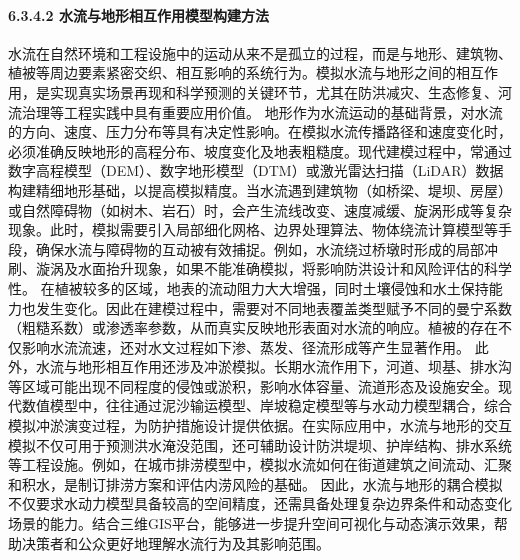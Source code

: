\paragraph{6.3.4.2
水流与地形相互作用模型构建方法}\label{ux6c34ux6d41ux4e0eux5730ux5f62ux76f8ux4e92ux4f5cux7528ux6a21ux578bux6784ux5efaux65b9ux6cd5}
水流在自然环境和工程设施中的运动从来不是孤立的过程，而是与地形、建筑物、植被等周边要素紧密交织、相互影响的系统行为。模拟水流与地形之间的相互作用，是实现真实场景再现和科学预测的关键环节，尤其在防洪减灾、生态修复、河流治理等工程实践中具有重要应用价值。
地形作为水流运动的基础背景，对水流的方向、速度、压力分布等具有决定性影响。在模拟水流传播路径和速度变化时，必须准确反映地形的高程分布、坡度变化及地表粗糙度。现代建模过程中，常通过数字高程模型（DEM）、数字地形模型（DTM）或激光雷达扫描（LiDAR）数据构建精细地形基础，以提高模拟精度。当水流遇到建筑物（如桥梁、堤坝、房屋）或自然障碍物（如树木、岩石）时，会产生流线改变、速度减缓、旋涡形成等复杂现象。此时，模拟需要引入局部细化网格、边界处理算法、物体绕流计算模型等手段，确保水流与障碍物的互动被有效捕捉。例如，水流绕过桥墩时形成的局部冲刷、漩涡及水面抬升现象，如果不能准确模拟，将影响防洪设计和风险评估的科学性。
在植被较多的区域，地表的流动阻力大大增强，同时土壤侵蚀和水土保持能力也发生变化。因此在建模过程中，需要对不同地表覆盖类型赋予不同的曼宁系数（粗糙系数）或渗透率参数，从而真实反映地形表面对水流的响应。植被的存在不仅影响水流流速，还对水文过程如下渗、蒸发、径流形成等产生显著作用。
此外，水流与地形相互作用还涉及冲淤模拟。长期水流作用下，河道、坝基、排水沟等区域可能出现不同程度的侵蚀或淤积，影响水体容量、流道形态及设施安全。现代数值模型中，往往通过泥沙输运模型、岸坡稳定模型等与水动力模型耦合，综合模拟冲淤演变过程，为防护措施设计提供依据。在实际应用中，水流与地形的交互模拟不仅可用于预测洪水淹没范围，还可辅助设计防洪堤坝、护岸结构、排水系统等工程设施。例如，在城市排涝模型中，模拟水流如何在街道建筑之间流动、汇聚和积水，是制订排涝方案和评估内涝风险的基础。
因此，水流与地形的耦合模拟不仅要求水动力模型具备较高的空间精度，还需具备处理复杂边界条件和动态变化场景的能力。结合三维GIS平台，能够进一步提升空间可视化与动态演示效果，帮助决策者和公众更好地理解水流行为及其影响范围。
